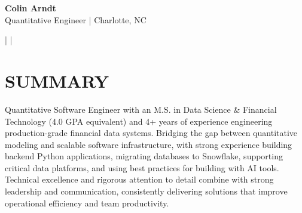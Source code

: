 \documentclass[letterpaper,11pt]{article}
\begin{document}
\begin{center}
    \vspace{7pt}

    \textbf{\Huge Colin Arndt} \\ \vspace{5pt}
    \small 
     Quantitative Engineer | Charlotte, NC  \\ \vspace{5pt} 
    
    \faPhone \hspace{2pt}{858.281.3748} \hspace{1pt}|
    \hspace{1pt} \faEnvelope \hspace{3pt}{colin.f.arndt@gmail.com} \hspace{1pt}| 
    \hspace{1pt} \faLinkedin \hspace{3pt}{linkedin.com/in/colinarndt} \hspace{1pt} 


    \vspace{7pt}
\end{center}

\section {SUMMARY}
 \begin{itemize}[leftmargin=0in, label={}]
    \small{\item{
 
       Quantitative Software Engineer with an M.S. in Data Science \& Financial Technology (4.0 GPA equivalent) and 4+ years of experience engineering production-grade financial data systems. Bridging the gap between quantitative modeling and scalable software infrastructure, with strong experience building backend Python applications, migrating databases to Snowflake, supporting critical data platforms, and using best practices for building with AI tools. Technical excellence and rigorous attention to detail combine with strong leadership and communication, consistently delivering solutions that improve operational efficiency and team productivity. 

        }}

 \end{itemize}
\end{document}
